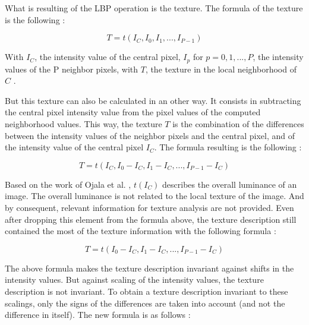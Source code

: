 \noindent What is resulting of the LBP operation is the texture. The formula of the texture is the following \cite{GAN08}:
\newline

\begin{equation}
   T = t(I_C, I_0, I_1, ..., I_{P-1})
\end{equation}

\vspace{\baselineskip}
\noindent With $ I_C $, the intensity value of the central pixel, $ I_p $ for $ p = 0, 1, ..., P $, the intensity values of the P neighbor pixels, with $ T $, the texture in the local neighborhood of $ C $ \cite{GAN08}.
\newline

\noindent But this texture can also be calculated in an other way. It consists in subtracting the central pixel intensity value from the pixel values of the computed neighborhood values. This way, the texture $ T $ is the combination of the differences between the intensity values of the neighbor pixels and the central pixel, and of the intensity value of the central pixel $ I_C $. The formula resulting is the following \cite{GAN08}:
\newline

\begin{equation}
   T = t(I_C, I_0 - I_C, I_1 - I_C, ..., I_{P-1} - I_C)
\end{equation}

\vspace{\baselineskip}
\noindent Based on the work of Ojala et al. \cite{OJA96}, $ t(I_C) $ describes the overall luminance of an image. The overall luminance is not related to the local texture of the image. And by consequent, relevant information for texture analysis are not provided. Even after dropping this element from the formula above, the texture description still contained the most of the texture information with the following formula \cite{GAN08}:
\newline

\begin{equation}
   T = t(I_0 - I_C, I_1 - I_C, ..., I_{P-1} - I_C)
\end{equation}

\vspace{\baselineskip}
\noindent The above formula makes the texture description invariant against shifts in the intensity values. But against scaling of the intensity values, the texture description is not invariant. To obtain a texture description invariant to these scalings, only the signs of the differences are taken into account (and not the difference in itself). The new formula is as follows \cite{GAN08}:
\newline

